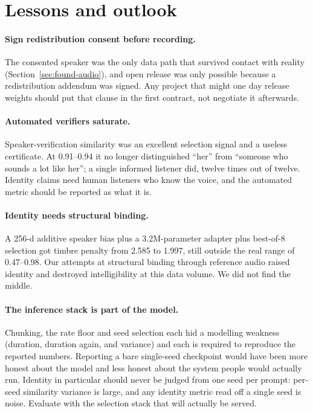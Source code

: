 \documentclass[10pt,twocolumn]{article}
\begin{document}
\section{Lessons and outlook}
\label{sec:lessons}

\paragraph{Sign redistribution consent before recording.} The consented speaker was the only data path that survived contact with reality (Section~\ref{sec:found-audio}), and open release was only possible because a redistribution addendum was signed. Any project that might one day release weights should put that clause in the first contract, not negotiate it afterwards.

\paragraph{Automated verifiers saturate.} Speaker-verification similarity was an excellent selection signal and a useless certificate. At 0.91--0.94 it no longer distinguished ``her'' from ``someone who sounds a lot like her''; a single informed listener did, twelve times out of twelve. Identity claims need human listeners who know the voice, and the automated metric should be reported as what it is.

\paragraph{Identity needs structural binding.} A 256-d additive speaker bias plus a 3.2M-parameter adapter plus best-of-8 selection got timbre penalty from 2.585 to 1.997, still outside the real range of 0.47--0.98. Our attempts at structural binding through reference audio raised identity and destroyed intelligibility at this data volume. We did not find the middle.

\paragraph{The inference stack is part of the model.} Chunking, the rate floor and seed selection each hid a modelling weakness (duration, duration again, and variance) and each is required to reproduce the reported numbers. Reporting a bare single-seed checkpoint would have been more honest about the model and less honest about the system people would actually run. Identity in particular should never be judged from one seed per prompt: per-seed similarity variance is large, and any identity metric read off a single seed is noise. Evaluate with the selection stack that will actually be served.
\end{document}
